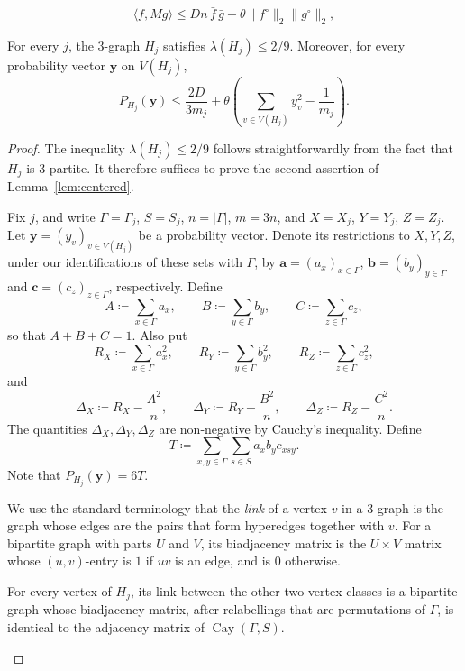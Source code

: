 \documentclass[10pt,a4paper]{amsart}
\DeclareMathOperator{\Cay}{Cay}
\begin{document}
\begin{equation}
        \langle f,Mg\rangle \le Dn\,\bar f\,\bar g+\theta\|f^\circ\|_2\|g^\circ\|_2,
        \label{eq:mixing}
\end{equation}

\begin{lemma}\label{lem:centered}
For every $j$, the $3$-graph $H_j$ satisfies $\lambda(H_j)\le 2/9$. Moreover, for every probability vector $\mathbf{y}$ on $V(H_j)$,
\[
        P_{H_j}(\mathbf{y})\le \frac{2D}{3m_j} +\theta\left(\sum_{v\in V(H_j)}y_v^2-\frac1{m_j}\right).
\]
\end{lemma}

\begin{proof}
The inequality $\lambda(H_j)\le 2/9$ follows straightforwardly from the fact that $H_j$ is $3$-partite. It therefore suffices to prove the second assertion of Lemma~\ref{lem:centered}.

	Fix $j$, and write $\Gamma=\Gamma_j$, $S=S_j$, $n=|\Gamma|$, $m=3n$, and $X=X_j$, $Y=Y_j$, $Z=Z_j$. Let $\mathbf{y}=(y_v)_{v\in V(H_j)}$ be a probability vector. Denote its restrictions to $X,Y,Z$, under our identifications of these sets with $\Gamma$, by $\mathbf{a}=(a_x)_{x\in\Gamma}$, $\mathbf{b}=(b_y)_{y\in\Gamma}$ and $\mathbf{c}=(c_z)_{z\in\Gamma}$, respectively.
Define
\[
        A\coloneqq \sum_{x\in\Gamma}a_x, \qquad B\coloneqq \sum_{y\in\Gamma}b_y, \qquad C\coloneqq \sum_{z\in\Gamma}c_z,
\]
so that $A+B+C=1$. Also put
\[
        R_X\coloneqq \sum_{x\in\Gamma} a_x^2, \qquad R_Y\coloneqq \sum_{y\in\Gamma} b_y^2, \qquad R_Z\coloneqq \sum_{z\in\Gamma} c_z^2,
\]
and
\[
        \Delta_X\coloneqq R_X-\frac{A^2}{n}, \qquad \Delta_Y\coloneqq R_Y-\frac{B^2}{n}, \qquad \Delta_Z\coloneqq R_Z-\frac{C^2}{n}.
\]
The quantities $\Delta_X,\Delta_Y,\Delta_Z$ are non-negative by Cauchy's inequality.
Define 
\[
        T
        \coloneqq \sum_{x,y\in\Gamma}\sum_{s\in S}a_xb_yc_{xsy} .
\]
Note that $P_{H_j}(\mathbf{y})=6T$.

We use the standard terminology that the \emph{link} of a vertex $v$ in a $3$-graph is the graph whose edges are the pairs that form hyperedges together with $v$. For a bipartite graph with parts $U$ and $V$, its biadjacency matrix is the $U\times V$ matrix whose $(u,v)$-entry is $1$ if $uv$ is an edge, and is $0$ otherwise. 

\begin{claim}\label{clm:link-relabel}
For every vertex of $H_j$, its link between the other two vertex classes is a bipartite graph whose biadjacency matrix, after relabellings that are permutations of $\Gamma$, is identical to the adjacency matrix of $\Cay(\Gamma,S)$.
\end{claim}


\end{proof}
\end{document}
